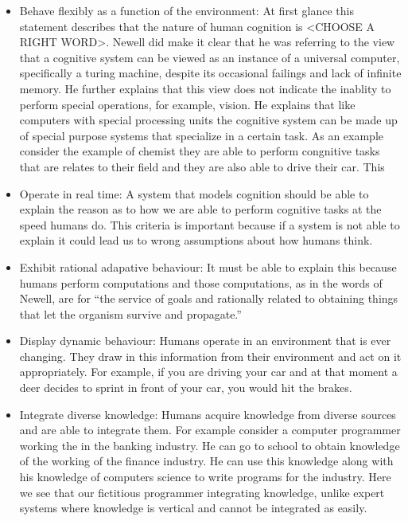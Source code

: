 \begin{itemize}
\item Behave flexibly as a function of the environment: At first
glance this statement describes that the nature of human cognition
is <CHOOSE A RIGHT WORD>. Newell did make it clear that he was referring
to the view that a cognitive system can be viewed as an instance of a
universal computer, specifically a turing machine, despite its occasional
failings and lack of infinite memory. He further explains that this
view does not indicate the inablity to perform special operations, for
example, vision. He explains that like computers with special
processing units the cognitive system can be made up of special
purpose systems that specialize in a certain task. As an example
consider the example of chemist they are able to perform congnitive
tasks that are relates to their field and they are also able to drive
their car. This 


\item Operate in real time: A system that models cognition should be
able to explain the reason as to how we are able to perform cognitive
tasks at the speed humans do. This criteria is important because if a
system is not able to explain it could lead us to wrong assumptions
about how humans think.


\item Exhibit rational adapative behaviour: It must be able to explain
this because humans perform computations and those computations, as in the words of
Newell\cite{Newell:1990aa}, are for ``the service of goals and
rationally related to obtaining things that let the organism survive
and propagate.''

\item Display dynamic behaviour: Humans operate in an
environment that is ever changing. They draw in this
information from their environment and act on it appropriately. For
example, if you are driving your car and at that moment a deer decides
to sprint in front of your car, you would hit the brakes. 

\item Integrate diverse knowledge: Humans acquire knowledge from
diverse sources and are able to integrate them. For example consider a
computer programmer working the in the banking industry. He can go to
school to obtain knowledge of the working of the finance industry. He
can use this knowledge along with his knowledge of computers science
to write programs for the industry. Here we see that our fictitious
programmer integrating knowledge, unlike expert systems where
knowledge is vertical and cannot be integrated as easily.


\end{itemize}
